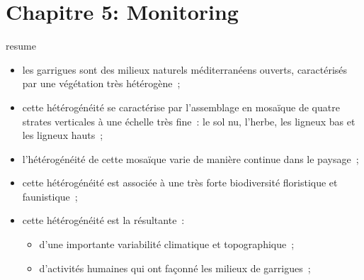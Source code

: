 \chapter{Chapitre 5: Monitoring } \label{chapitre5-capferrat}

\pagestyle{main}


\begin{center}
\begin{colbox}{resume}
  \vspace{-2pt}
{\color{textresume}\small
\begin{itemize}[leftmargin=0in]\itemsep3pt
\item les garrigues sont des milieux naturels méditerranéens ouverts, caractérisés par une végétation très hétérogène~;
\item cette hétérogénéité se caractérise par l'assemblage en mosaïque de quatre strates verticales à une échelle très fine~: le sol nu, l'herbe, les ligneux bas et les ligneux hauts~;
\item l'hétérogénéité de cette mosaïque varie de manière continue dans le paysage~;
\item cette hétérogénéité est associée à une très forte biodiversité floristique et faunistique~;
\item cette hétérogénéité est la résultante~:
\begin{itemize}
  \item d'une importante variabilité climatique et topographique~;
  \item d'activités humaines qui ont façonné les milieux de garrigues~;
\end{itemize}
\end{itemize}
}
\vspace{-2pt}
\end{colbox}
\end{center}

